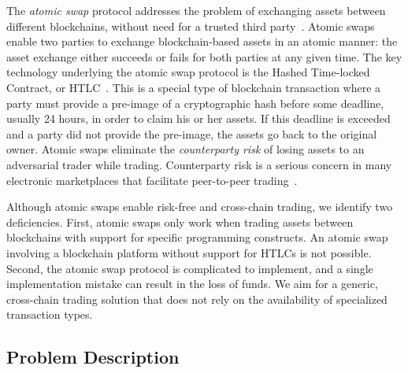 The \emph{atomic swap} protocol addresses the problem of exchanging assets between different blockchains, without need for a trusted third party~\cite{herlihy2018atomic}.
Atomic swaps enable two parties to exchange blockchain-based assets in an atomic manner: the asset exchange either succeeds or fails for both parties at any given time.
The key technology underlying the atomic swap protocol is the Hashed Time-locked Contract, or HTLC~\cite{bowe2018hashed}.
This is a special type of blockchain transaction where a party must provide a pre-image of a cryptographic hash before some deadline, usually 24 hours, in order to claim his or her assets.
If this deadline is exceeded and a party did not provide the pre-image, the assets go back to the original owner.
Atomic swaps eliminate the \emph{counterparty risk} of losing assets to an adversarial trader while trading.
Counterparty risk is a serious concern in many electronic marketplaces that facilitate peer-to-peer trading~\cite{peters2016understanding}.

Although atomic swaps enable risk-free and cross-chain trading, we identify two deficiencies.
First, atomic swaps only work when trading assets between blockchains with support for specific programming constructs.
An atomic swap involving a blockchain platform without support for HTLCs is not possible.
Second, the atomic swap protocol is complicated to implement, and a single implementation mistake can result in the loss of funds.
We aim for a generic, cross-chain trading solution that does not rely on the availability of specialized transaction types.

\subsection{Problem Description}
\label{sec:problem_description}



